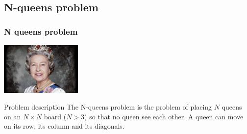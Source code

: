 \subsection{N-queens problem}
\begin{frame}[containsverbatim]
\frametitle{N queens problem}
\begin{center}
\includegraphics[width=4.0cm]{Day2/images/queen.jpg}
\end{center}
\begin{block}{Problem description}
The N-queens problem is the problem of placing $N$ queens on an $N \times N$ board ($N>3$) so that no queen see each other. A queen can move on its row, its column and its diagonals.
\end{block}
\end{frame}





